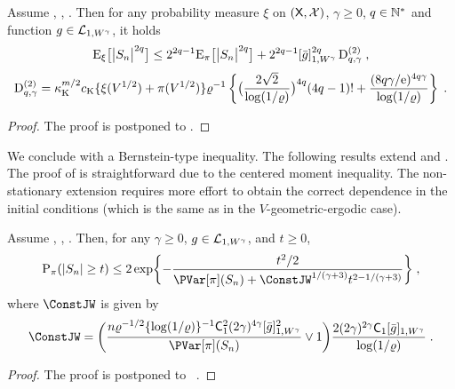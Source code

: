 \documentclass[sn-mathphys,Numbered]{sn-jnl}%
\begin{document}
\begin{theorem}
\label{theo:changeofmeasure-1_wasser}
Assume , , . Then for any probability measure $\xi$ on $(\Xset,\Xsigma)$, $\gamma \geq 0$, $q \in \nsets$ and function $g \in \Lclass_{1, W^\gamma}$, it holds
\begin{equation*}
     \PE_\xi\big[ \big|S_n \big|^{2q} \big] \leq 2^{2q-1} \PE_\pi\big[ \big|S_n \big|^{2q} \big] + 2^{2q-1} \Nnorm[1,W^\gamma]{\bar{g}}^{2q} \operatorname{D}^{(2)}_{q,\gamma} \eqsp,
\end{equation*}
\begin{multline*}
  \operatorname{D}^{(2)}_{q,\gamma}=
  \boundmetric^{m/2}  \vartconstwas \{ \xi(V^{1/2}) + \pi(V^{1/2}) \} \ratewas^{-1} \defEns{ \bigl(\frac{2\sqrt{2}}{\log(1/\ratewas)}\bigr)^{4q} (4q-1)! +  \frac{(8q\gamma/\rme)^{4q\gamma}}{\log(1/\ratewas)}}\eqsp.
\end{multline*}
\end{theorem}
\begin{proof}
The proof is postponed to .
\end{proof}
We conclude with a Bernstein-type inequality. The following results extend 
and . The proof of  is straightforward due to the centered moment inequality. The non-stationary extension  requires more effort to obtain the correct dependence in the initial conditions (which is the same as in the $V$-geometric-ergodic case).
\begin{theorem}
\label{th:rosenthal_log_V_cor_2_wasserstein}
Assume , , . Then,  for any $\gamma \geq 0$, $g \in \Lclass_{1, W^\gamma}$, and  $t \geq 0$,
\begin{equation}
\PP_{\pi}(|S_n| \geq t) \leq 2\exp\biggl\{-\frac{t^2/2}{\PVar[\pi](S_n) + \ConstJW^{1/(\gamma+3)} t^{2-1/(\gamma+3)}}\biggr\}\eqsp,
\end{equation}
where $\ConstJW$ is given by
\begin{equation}
\label{eq:const_J_n_definition_main_was}
\ConstJW = \biggl( \frac{n \ratewas^{-1/2} \{\log(1/\ratewas)\}^{-1} \Constwasspoly^{2} (2\gamma)^{4\gamma} \Nnorm[1, W^{\gamma}]{\bar{g}}^{2}}{\PVar[\pi](S_n)} \vee 1\biggr) \frac{2 (2\gamma)^{2\gamma} \Constwasspoly \Nnorm[1, W^{\gamma}]{\bar{g}}}{\log(1/\ratewas)}\eqsp.
\end{equation}
\end{theorem}
\begin{proof}
The proof is postponed to ~.
\end{proof}
\end{document}
